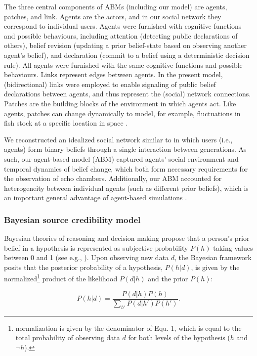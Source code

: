 \documentclass[doc,floatsintext]{apa6}
\begin{document}
The three central components of ABMs (including our model) are agents, patches, and link. Agents are the actors, and in our social network they correspond to individual users. Agents were furnished with cognitive functions and possible behaviours, including attention (detecting public declarations of others), belief revision (updating a prior belief-state based on observing another agent’s belief), and declaration (commit to a belief using a deterministic decision rule). All agents were furnished with the same cognitive functions and possible behaviours. Links represent edges between agents. In the present model, (bidirectional) links were employed to enable signaling of public belief declarations between agents, and thus represent the (social) network connections. Patches are the building blocks of the environment in which agents act. Like agents, patches can change dynamically to model, for example, fluctuations in fish stock at a specific location in space \citep{bailey2018computational}. 

We reconstructed an idealized social network similar to \citep{pilditch2017opinion, madsen2018large} in which users (i.e., agents) form binary beliefs through a single interaction between generations. As such, our agent-based model (ABM) captured agents' social environment and temporal dynamics of belief change, which both form necessary requirements for the observation of echo chambers. Additionally, our ABM accounted for heterogeneity between individual agents (such as different prior beliefs), which is an important general advantage of agent-based simulations \citep{wilensky2015introduction}. 

\subsubsection{Bayesian source credibility model}
Bayesian theories of reasoning and decision making propose that a person's prior belief in a hypothesis is represented as subjective probability \(P(h)\) taking values between 0 and 1 (see e.g., \cite{hahn2007rationality, oaksford2007bayesian}). Upon observing new data \(d\), the Bayesian framework posits that the posterior probability of a hypothesis, \(P(h|d)\), is given by the normalized\footnote{normalization is given by the denominator of Equ. 1, which is equal to the total probability of observing data \(d\) for both levels of the hypothesis (\(h\) and \(\neg h\)).} product of the likelihood \(P(d|h)\) and the prior \(P(h)\):

\begin{equation}
    P(h|d) = \frac{P(d|h)P(h)}{\sum_{h'}P(d|h')P(h')}.              
\end{equation}
\end{document}
